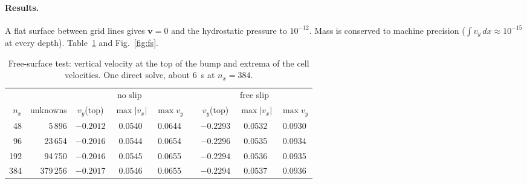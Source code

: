 \documentclass[11pt,a4paper]{article}
\begin{document}
\paragraph{Results.} A flat surface between grid lines gives $\mathbf v=0$ and the hydrostatic
pressure to $10^{-12}$. Mass is conserved to machine precision ($\int v_y\,dx\approx10^{-15}$ at
every depth). Table~\ref{tab:fs} and Fig.~\ref{fig:fs}.

\begin{table}[h]
\centering
\small
\begin{tabular}{@{}r r ccc c ccc@{}}
\toprule
& & \multicolumn{3}{c}{no slip} && \multicolumn{3}{c}{free slip}\\
\cmidrule(lr){3-5}\cmidrule(l){7-9}
$n_x$ & unknowns & $v_y$(top) & $\max|v_x|$ & $\max v_y$ && $v_y$(top) & $\max|v_x|$ & $\max v_y$\\
\midrule
 48 &   5\,896 & $-0.2012$ & 0.0540 & 0.0644 && $-0.2293$ & 0.0532 & 0.0930\\
 96 &  23\,654 & $-0.2016$ & 0.0544 & 0.0654 && $-0.2296$ & 0.0535 & 0.0934\\
192 &  94\,750 & $-0.2016$ & 0.0545 & 0.0655 && $-0.2294$ & 0.0536 & 0.0935\\
384 & 379\,256 & $-0.2017$ & 0.0546 & 0.0655 && $-0.2294$ & 0.0537 & 0.0936\\
\bottomrule
\end{tabular}
\caption{Free-surface test: vertical velocity at the top of the bump and extrema of the cell
velocities. One direct solve, about 6~s at $n_x=384$.}
\label{tab:fs}
\end{table}
\end{document}
